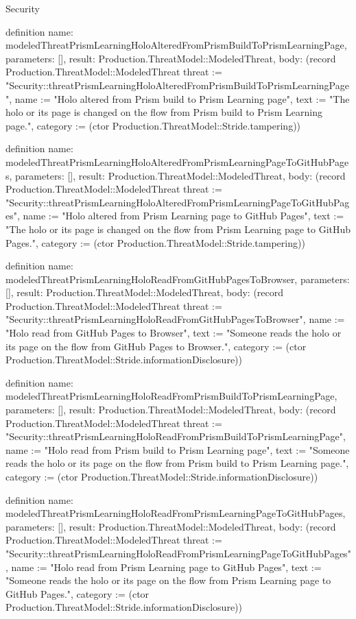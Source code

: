\begin{lexlean}{Security}
\begin{semanticmodule}
definition{
  name: modeledThreatPrismLearningHoloAlteredFromPrismBuildToPrismLearningPage,
  parameters: [],
  result: Production.ThreatModel::ModeledThreat,
  body: (record Production.ThreatModel::ModeledThreat {threat := "Security::threatPrismLearningHoloAlteredFromPrismBuildToPrismLearningPage", name := "Holo altered from Prism build to Prism Learning page", text := "The holo or its page is changed on the flow from Prism build to Prism Learning page.", category := (ctor Production.ThreatModel::Stride.tampering)})
}

definition{
  name: modeledThreatPrismLearningHoloAlteredFromPrismLearningPageToGitHubPages,
  parameters: [],
  result: Production.ThreatModel::ModeledThreat,
  body: (record Production.ThreatModel::ModeledThreat {threat := "Security::threatPrismLearningHoloAlteredFromPrismLearningPageToGitHubPages", name := "Holo altered from Prism Learning page to GitHub Pages", text := "The holo or its page is changed on the flow from Prism Learning page to GitHub Pages.", category := (ctor Production.ThreatModel::Stride.tampering)})
}

definition{
  name: modeledThreatPrismLearningHoloReadFromGitHubPagesToBrowser,
  parameters: [],
  result: Production.ThreatModel::ModeledThreat,
  body: (record Production.ThreatModel::ModeledThreat {threat := "Security::threatPrismLearningHoloReadFromGitHubPagesToBrowser", name := "Holo read from GitHub Pages to Browser", text := "Someone reads the holo or its page on the flow from GitHub Pages to Browser.", category := (ctor Production.ThreatModel::Stride.informationDisclosure)})
}

definition{
  name: modeledThreatPrismLearningHoloReadFromPrismBuildToPrismLearningPage,
  parameters: [],
  result: Production.ThreatModel::ModeledThreat,
  body: (record Production.ThreatModel::ModeledThreat {threat := "Security::threatPrismLearningHoloReadFromPrismBuildToPrismLearningPage", name := "Holo read from Prism build to Prism Learning page", text := "Someone reads the holo or its page on the flow from Prism build to Prism Learning page.", category := (ctor Production.ThreatModel::Stride.informationDisclosure)})
}

definition{
  name: modeledThreatPrismLearningHoloReadFromPrismLearningPageToGitHubPages,
  parameters: [],
  result: Production.ThreatModel::ModeledThreat,
  body: (record Production.ThreatModel::ModeledThreat {threat := "Security::threatPrismLearningHoloReadFromPrismLearningPageToGitHubPages", name := "Holo read from Prism Learning page to GitHub Pages", text := "Someone reads the holo or its page on the flow from Prism Learning page to GitHub Pages.", category := (ctor Production.ThreatModel::Stride.informationDisclosure)})
}


\end{semanticmodule}
\end{lexlean}
